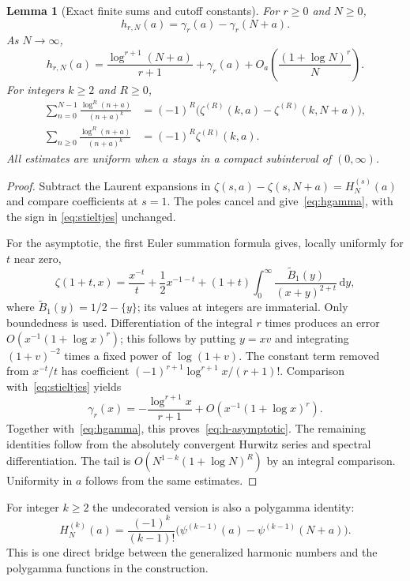 \documentclass[11pt,oneside]{article}
\numberwithin{equation}{section}
\newtheorem{lemma}[theorem]{Lemma}
\theoremstyle{definition}
\theoremstyle{remark}
\newcommand{\dd}{\,\mathrm d}
\begin{document}
\begin{lemma}[Exact finite sums and cutoff constants]\label{lem:harmonic}
For $r\ge0$ and $N\ge0$,
\begin{equation}\label{eq:hgamma}
h_{r,N}(a)=\gamma_r(a)-\gamma_r(N+a).
\end{equation}
As $N\to\infty$,
\begin{equation}\label{eq:h-asymptotic}
h_{r,N}(a)=\frac{\log^{r+1}(N+a)}{r+1}+\gamma_r(a)
 +O_a\!\left(\frac{(1+\log N)^r}{N}\right).
\end{equation}
For integers $k\ge2$ and $R\ge0$,
\begin{align}
\sum_{n=0}^{N-1}\frac{\log^R(n+a)}{(n+a)^k}
 &=(-1)^R\bigl(\zeta^{(R)}(k,a)-\zeta^{(R)}(k,N+a)\bigr),
 \label{eq:higher-power}\\
\sum_{n\ge0}\frac{\log^R(n+a)}{(n+a)^k}
 &=(-1)^R\zeta^{(R)}(k,a).\label{eq:higher-limit}
\end{align}
All estimates are uniform when $a$ stays in a compact subinterval of $(0,\infty)$.
\end{lemma}

\begin{proof}
Subtract the Laurent expansions in
$\zeta(s,a)-\zeta(s,N+a)=H_N^{(s)}(a)$ and compare coefficients at $s=1$.
The poles cancel and give~\eqref{eq:hgamma}, with the sign in
\eqref{eq:stieltjes} unchanged.

For the asymptotic, the first Euler summation formula gives, locally uniformly
for $t$ near zero,
\[
\zeta(1+t,x)=\frac{x^{-t}}{t}+\frac12x^{-1-t}
 +(1+t)\int_0^\infty \frac{\widetilde B_1(y)}{(x+y)^{2+t}}\dd y,
\]
where $\widetilde B_1(y)=1/2-\{y\}$; its values at integers are immaterial.
Only boundedness is used. Differentiation of the
integral $r$ times produces an error
$O(x^{-1}(1+\log x)^r)$; this follows by putting $y=xv$ and integrating
$(1+v)^{-2}$ times a fixed power of $\log(1+v)$. The constant term removed from
$x^{-t}/t$ has coefficient
$(-1)^{r+1}\log^{r+1}x/(r+1)!$. Comparison with~\eqref{eq:stieltjes} yields
\[
\gamma_r(x)=-\frac{\log^{r+1}x}{r+1}
 +O(x^{-1}(1+\log x)^r).
\]
Together with~\eqref{eq:hgamma}, this proves~\eqref{eq:h-asymptotic}.
The remaining identities follow from the absolutely convergent Hurwitz series
and spectral differentiation. The tail is
$O(N^{1-k}(1+\log N)^R)$ by an integral comparison. Uniformity in $a$ follows
from the same estimates.
\end{proof}

For integer $k\ge2$ the undecorated version is also a polygamma identity:
\begin{equation}\label{eq:polygamma-harmonic}
H_N^{(k)}(a)=\frac{(-1)^k}{(k-1)!}
 \bigl(\psi^{(k-1)}(a)-\psi^{(k-1)}(N+a)\bigr).
\end{equation}
This is one direct bridge between the generalized harmonic numbers and the
polygamma functions in the construction.
\end{document}
